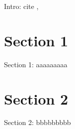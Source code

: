\minitoc

\vspace{0.5cm}
Intro: cite \cite{cochrane2009asset}, \cite{campbell2017financial}

\section{Section 1}
Section 1: aaaaaaaaa

\section{Section 2}
Section 2: bbbbbbbbb